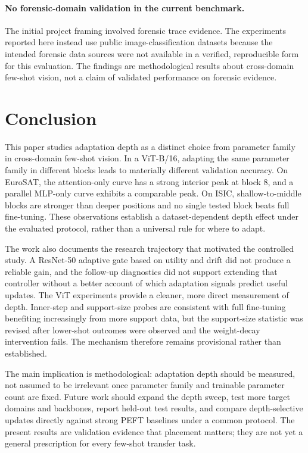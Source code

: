 \documentclass[11pt]{article}
\begin{document}
\paragraph{No forensic-domain validation in the current benchmark.} The initial project framing involved forensic trace evidence. The experiments reported here instead use public image-classification datasets because the intended forensic data sources were not available in a verified, reproducible form for this evaluation. The findings are methodological results about cross-domain few-shot vision, not a claim of validated performance on forensic evidence.

\section{Conclusion}

This paper studies adaptation depth as a distinct choice from parameter family in cross-domain few-shot vision. In a ViT-B/16, adapting the same parameter family in different blocks leads to materially different validation accuracy. On EuroSAT, the attention-only curve has a strong interior peak at block 8, and a parallel MLP-only curve exhibits a comparable peak. On ISIC, shallow-to-middle blocks are stronger than deeper positions and no single tested block beats full fine-tuning. These observations establish a dataset-dependent depth effect under the evaluated protocol, rather than a universal rule for where to adapt.

The work also documents the research trajectory that motivated the controlled study. A ResNet-50 adaptive gate based on utility and drift did not produce a reliable gain, and the follow-up diagnostics did not support extending that controller without a better account of which adaptation signals predict useful updates. The ViT experiments provide a cleaner, more direct measurement of depth. Inner-step and support-size probes are consistent with full fine-tuning benefiting increasingly from more support data, but the support-size statistic was revised after lower-shot outcomes were observed and the weight-decay intervention fails. The mechanism therefore remains provisional rather than established.

The main implication is methodological: adaptation depth should be measured, not assumed to be irrelevant once parameter family and trainable parameter count are fixed. Future work should expand the depth sweep, test more target domains and backbones, report held-out test results, and compare depth-selective updates directly against strong PEFT baselines under a common protocol. The present results are validation evidence that placement matters; they are not yet a general prescription for every few-shot transfer task.
\end{document}
